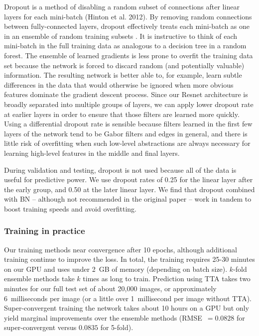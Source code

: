 \documentclass[fleqn,usenatbib]{mnras}
\begin{document}
Dropout is a method of disabling a random subset of connections after linear layers for each mini-batch (Hinton et al. 2012).
By removing random connections between fully-connected layers, dropout effectively treats each mini-batch as one in an ensemble of random training subsets .
It is instructive to think of each mini-batch in the full training data as analogous to a decision tree in a random forest.
The ensemble of learned gradients is less prone to overfit the training data set because the network is forced to discard random (and potentially valuable) information.
The resulting network is better able to, for example, learn subtle differences in the data that would otherwise be ignored when more obvious features dominate the gradient descent process.
Since our Resnet architecture is broadly separated into multiple groups of layers, we can apply lower dropout rate at earlier layers in order to ensure that those filters are learned more quickly.
Using a differential dropout rate is sensible because filters learned in the first few layers of the network tend to be Gabor filters and edges in general, and there is little risk of overfitting when such low-level abstractions are always necessary for learning high-level features in the middle and final layers.

During validation and testing, dropout is not used because all of the data is useful for predictive power.
We use dropout rates of 0.25 for the linear layer after the early group, and 0.50 at the later linear layer.
We find that dropout combined with BN -- although not recommended in the original paper -- work in tandem to boost training speeds and avoid overfitting.


\subsubsection{Training in practice}

Our training methods near convergence after 10 epochs, although additional training continue to improve the loss.
In total, the training requires 25-30 minutes on our GPU and uses under 2~GB of memory (depending on batch size).
$k$-fold ensemble methods take $k$ times as long to train.
Prediction using TTA takes two minutes for our full test set of about 20,000 images, or approximately 6~milliseconds per image (or a little over 1~millisecond per image without TTA).
Super-convergent training the network takes about 10 hours on a GPU but only yield marginal improvements over the ensemble methods (RMSE~$= 0.0828$ for super-convergent versus $0.0835$ for 5-fold).
\end{document}
